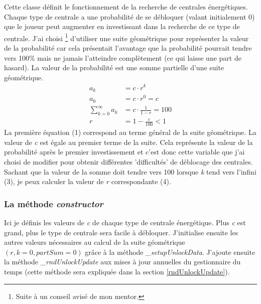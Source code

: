 \documentclass{article}
\begin{document}
		Cette classe définit le fonctionnement de la recherche de centrales énergétiques.
		Chaque type de centrale a une probabilité de se débloquer (valant initialement 0) que le joueur peut augmenter en investissant dans la recherche de ce type de centrale. J'ai choisi \footnote{Suite à un conseil avisé de mon mentor.} d'utiliser une suite géométrique pour représenter la valeur de la probabilité car cela présentait l'avantage que la probabilité pourrait tendre vers 100\% mais ne jamais l'atteindre complètement (ce qui laisse une part de hasard).
		La valeur de la probabilité est une somme partielle d'une suite géométrique.
		\begin{align}
  			a_{k} &= c\cdot r^{k} \\
    			a_{0} &= c\cdot r^{0} = c \\
    			\sum_{k=0}^{\infty} a_{k} &= c\cdot \frac{1}{1-r} = 100 \\
    			r &= 1 - \frac{c}{100} < 1
		\end{align}
		La première équation (1) correspond au terme général de la suite géométrique.
		La valeur de \textit{c} est égale au premier terme de la suite. Cela représente la valeur de la probabilité après le premier investissement et c'est donc cette variable que j'ai choisi de modifier pour obtenir différentes 'difficultés' de déblocage des centrales. Sachant que la valeur de la somme doit tendre vers 100 lorsque \textit{k} tend vers l'infini (3), je peux calculer la valeur de \textit{r} correspondante (4).
		
        
        \subsubsection{La méthode \textit{constructor}}
        Ici je définis les valeurs de \textit{c} de chaque type de centrale énergétique. Plus \textit{c} est grand, plus le type de centrale sera facile à débloquer. J'initialise ensuite les autres valeurs nécessaires au calcul de la suite géométrique $(r, k=0, partSum=0)$ grâce à la méthode \textit{\_setupUnlockData}. J'ajoute ensuite la méthode \textit{\_rndUnlockUpdate} aux mises à jour annuelles du gestionnaire du temps (cette méthode sera expliquée dans la section \ref{rndUnlockUpdate}).
        
\end{document}
